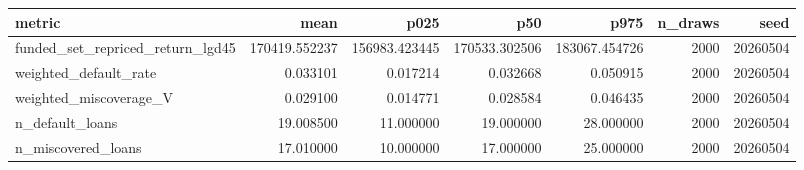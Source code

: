 \begin{tabular}{lrrrrrr}
\toprule
metric & mean & p025 & p50 & p975 & n\_draws & seed \\
\midrule
funded\_set\_repriced\_return\_lgd45 & 170419.552237 & 156983.423445 & 170533.302506 & 183067.454726 & 2000 & 20260504 \\
weighted\_default\_rate & 0.033101 & 0.017214 & 0.032668 & 0.050915 & 2000 & 20260504 \\
weighted\_miscoverage\_V & 0.029100 & 0.014771 & 0.028584 & 0.046435 & 2000 & 20260504 \\
n\_default\_loans & 19.008500 & 11.000000 & 19.000000 & 28.000000 & 2000 & 20260504 \\
n\_miscovered\_loans & 17.010000 & 10.000000 & 17.000000 & 25.000000 & 2000 & 20260504 \\
\bottomrule
\end{tabular}
